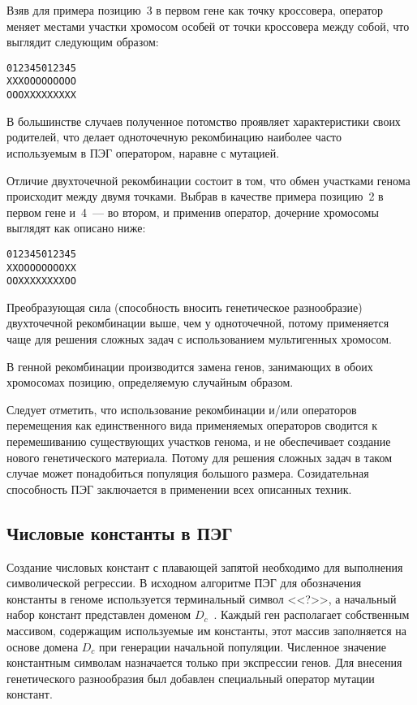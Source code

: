 Взяв для примера позицию~3 в первом гене как точку кроссовера, оператор меняет местами участки хромосом особей от точки кроссовера между собой, что выглядит следующим образом:

\begin{samepage}
\begin{alltt}
012345012345
XXXOOOOOOOOO
OOOXXXXXXXXX
\end{alltt}
\end{samepage}

В большинстве случаев полученное потомство проявляет характеристики своих родителей, что делает одноточечную рекомбинацию наиболее часто используемым в ПЭГ оператором, наравне с мутацией.

Отличие двухточечной рекомбинации состоит в том, что обмен участками генома происходит между двумя точками. Выбрав в качестве примера позицию~2 в первом гене и~4~--- во втором, и применив оператор, дочерние хромосомы выглядят как описано ниже:

\begin{alltt}
012345012345
XXOOOOOOOOXX
OOXXXXXXXXOO
\end{alltt}

Преобразующая сила (способность вносить генетическое разнообразие) двухточечной рекомбинации выше, чем у одноточечной, потому применяется чаще для решения сложных задач с использованием мультигенных хромосом.

В генной рекомбинации производится замена генов, занимающих в обоих хромосомах позицию, определяемую случайным образом.

Следует отметить, что использование рекомбинации и/или операторов перемещения как единственного вида применяемых операторов сводится к перемешиванию существующих участков генома, и не обеспечивает создание нового генетического материала. Потому для решения сложных задач в таком случае может понадобиться популяция большого размера. Созидательная способность ПЭГ заключается в применении всех описанных техник.






\subsection{Числовые константы в ПЭГ}

Создание числовых констант с плавающей запятой необходимо для выполнения символической регрессии. В исходном алгоритме ПЭГ для обозначения константы в геноме используется терминальный символ <<?>>, а начальный набор констант представлен доменом $D_c$~\cite{ferreira:2002:WSC}. Каждый ген располагает собственным массивом, содержащим используемые им константы, этот массив заполняется на основе домена $D_c$ при генерации начальной популяции. Численное значение константным символам назначается только при экспрессии генов. Для внесения генетического разнообразия был добавлен специальный оператор мутации констант.

